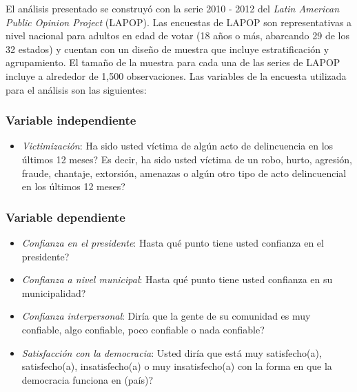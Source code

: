 \documentclass[letterpaper]{article}
\begin{document}
El análisis presentado se construyó con la serie 2010 - 2012 del \emph{Latin American Public Opinion Project} (LAPOP). Las encuestas de LAPOP son representativas a nivel nacional para adultos en edad de votar (18 años o más, abarcando 29 de los 32 estados) y cuentan con un diseño de muestra que incluye estratificación y agrupamiento. El tamaño de la muestra para cada una de las series de LAPOP incluye a alrededor de 1,500 observaciones. Las variables de la encuesta utilizada para el análisis son las siguientes:

\subsubsection{Variable independiente} 

\vspace{-0.2cm}
\begin{itemize}
\setlength{\itemsep}{0pt}%
\setlength{\parskip}{0pt}%
\item \emph{Victimización}: Ha sido usted víctima de algún acto de delincuencia en los últimos 12 meses? Es decir, ha sido usted víctima de un robo, hurto, agresión, fraude, chantaje, extorsión, amenazas o algún otro tipo de acto delincuencial en los últimos 12 meses?
\end{itemize}

\subsubsection{Variable dependiente} 

\vspace{-0.2cm}
\begin{itemize}
\setlength{\itemsep}{0pt}%
\setlength{\parskip}{0pt}%
\item \emph{Confianza en el presidente}: Hasta qué punto tiene usted confianza en el presidente?
\item \emph{Confianza a nivel municipal}: Hasta qué punto tiene usted confianza en su municipalidad?
\item \emph{Confianza interpersonal}: Diría que la gente de su comunidad es muy confiable, algo confiable, poco confiable o nada confiable?
\item \emph{Satisfacción con la democracia}: Usted diría que está muy satisfecho(a), satisfecho(a), insatisfecho(a) o muy insatisfecho(a) con la forma en que la democracia funciona en (país)?
\end{itemize}
\end{document}

